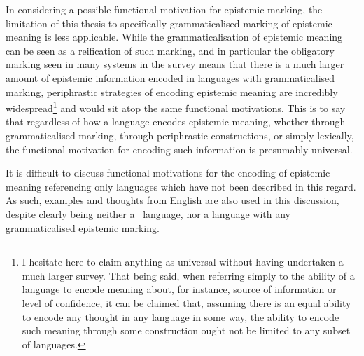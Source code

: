 In considering a possible functional motivation for epistemic marking, the limitation of this thesis to specifically grammaticalised marking of epistemic meaning is less applicable. While the grammaticalisation of epistemic meaning can be seen as a reification of such marking, and in particular the obligatory marking seen in many systems in the survey means that there is a much larger amount of epistemic information encoded in languages with grammaticalised marking, periphrastic strategies of encoding epistemic meaning are incredibly widespread\footnote{I hesitate here to claim anything as universal without having undertaken a much larger survey. That being said, when referring simply to the ability of a language to encode meaning about, for instance, source of information or level of confidence, it can be claimed that, assuming there is an equal ability to encode any thought in any language in some way, the ability to encode such meaning through some construction ought not be limited to any subset of languages.} and would sit atop the same functional motivations. This is to say that regardless of how a language encodes epistemic meaning, whether through grammaticalised marking, through periphrastic constructions, or simply lexically, the functional motivation for encoding such information is presumably universal.

It is difficult to discuss functional motivations for the encoding of epistemic meaning referencing only languages which have not been described in this regard. As such, examples and thoughts from English are also used in this discussion, despite clearly being neither a \lfam\ language, nor a language with any grammaticalised epistemic marking.


